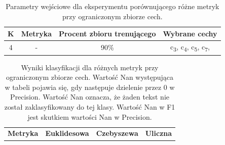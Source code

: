 \documentclass{classrep}
\begin{document}
\begin{table}[h!]
\caption{Parametry wejściowe dla eksperymentu porównującego różne metryk przy ograniczonym zbiorze cech. }
\centering
\vspace{0.1cm}
 \begin{tabular}{c c c c}
    \textbf{K} & \textbf{Metryka}   & \textbf{Procent zbioru trenującego}  & \textbf{Wybrane cechy}   \\
\hline
4 & - & 90\% &  c\textsubscript{3},  c\textsubscript{4},  c\textsubscript{5},  c\textsubscript{7}, \\
\end {tabular}
\label {Parametry wejściowe dla eksperymentu porównującego różne metryk przy ograniczonym zbiorze cech. }
\end{table}

\newpage
\begin{table}[h!]
\caption{Wyniki klasyfikacji dla różnych metryk przy ograniczonym zbiorze cech. Wartość Nan występująca w tabeli pojawia się, gdy następuje dzielenie przez 0 w Precision. Wartość Nan oznacza, że żaden tekst nie został zaklasyfikowany do tej klasy. Wartość Nan w F1 jest skutkiem wartości Nan w Precision.}
\centering
\vspace{0.1cm}
 \begin{tabular}{c c c c}

    \textbf{Metryka} & \textbf{Euklidesowa}   & \textbf{Czebyszewa}  & \textbf{Uliczna}  \\


\end{tabular}
\end{table}
\end{document}
